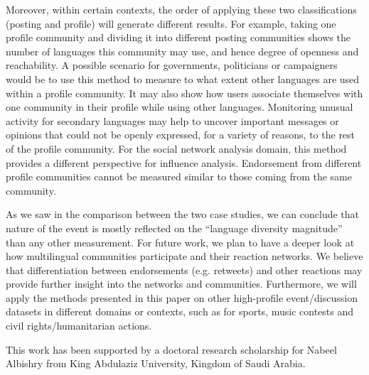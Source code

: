 Moreover, within certain contexts, the order of applying these two
classifications (posting and profile) will generate different results.
For example, taking one profile community and dividing it into
different posting communities shows the number of languages this
community may use, and hence degree of openness and reachability. A
possible scenario for governments, politicians or campaigners would be
to use this method to measure to what extent other languages are used
within a profile community. It may also show how users associate
themselves with one community in their profile while using other
languages. Monitoring unusual activity for secondary languages may
help to uncover important messages or opinions that could not be
openly expressed, for a variety of reasons, to the rest of the profile
community. For the social network analysis domain, this method
provides a different perspective for influence analysis. Endorsement
from different profile communities cannot be measured similar to those
coming from the same community.

As we saw in the comparison between the two case studies, we can conclude that 
nature of the event is mostly reflected on the ``language diversity magnitude'' than any other measurement. 
For future work, we plan to have a deeper look at how multilingual
communities participate and their reaction networks. We believe that
differentiation between endorsements (e.g. retweets) and other
reactions may provide further insight into the networks and
communities. Furthermore, we will apply the methods presented in this
paper on other high-profile event/discussion datasets in different
domains or contexts, such as for sports, music contests and civil
rights/humanitarian actions.



\begin{acks}
This work has been supported by a doctoral research scholarship for
Nabeel Albishry from King Abdulaziz University, Kingdom of Saudi
Arabia.
\end{acks}
